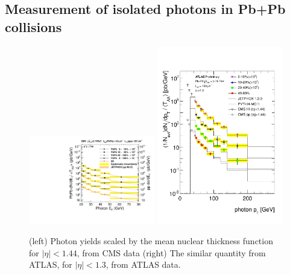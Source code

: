 \subsection{Measurement of isolated photons in Pb+Pb collisions}

\begin{figure}[!htb]
\begin{center}
\includegraphics[width=0.49\textwidth]{electroweak_figs/TAAScaling.pdf}
\includegraphics[width=0.49\textwidth]{electroweak_figs/ph_fig_11.pdf}
\caption[]{(left) Photon yields scaled by the mean nuclear thickness function for $|\eta|<1.44$, from CMS data (right) The similar quantity from ATLAS, for $|\eta|<1.3$, from ATLAS data.}
\label{fig:pas:zw}
\end{center}
\end{figure}


